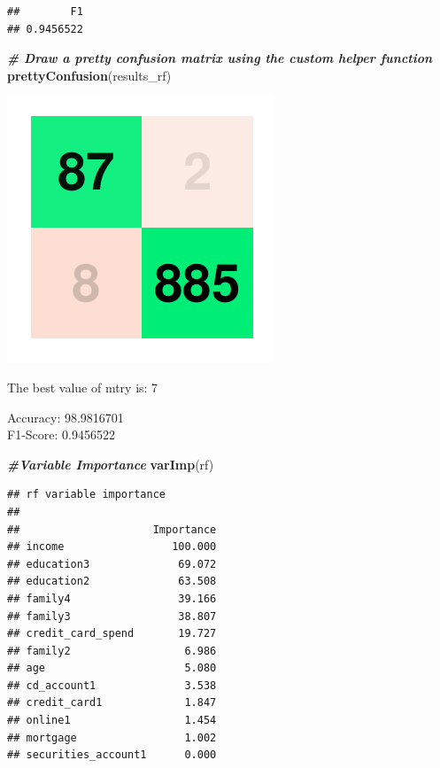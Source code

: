 \documentclass[
]{article}
\newenvironment{Shaded}{\begin{snugshade}}{\end{snugshade}}
\newcommand{\CommentTok}[1]{\textcolor[rgb]{0.00,0.40,1.00}{\textbf{\textit{#1}}}}
\newcommand{\KeywordTok}[1]{\textcolor[rgb]{0.26,0.66,0.93}{\textbf{#1}}}
\newcommand{\NormalTok}[1]{\textcolor[rgb]{0.74,0.68,0.62}{#1}}
\begin{document}
\begin{verbatim}
##        F1 
## 0.9456522
\end{verbatim}

\begin{Shaded}
\begin{Highlighting}[]
\CommentTok{# Draw a pretty confusion matrix using the custom helper function}
\KeywordTok{prettyConfusion}\NormalTok{(results_rf)}
\end{Highlighting}
\end{Shaded}

\includegraphics{Bank_Loan_Classification_files/figure-latex/unnamed-chunk-35-2.pdf}

The best value of mtry is: 7

Accuracy: 98.9816701\\
F1-Score: 0.9456522

\begin{Shaded}
\begin{Highlighting}[]
\CommentTok{#Variable Importance}
\KeywordTok{varImp}\NormalTok{(rf)}
\end{Highlighting}
\end{Shaded}

\begin{verbatim}
## rf variable importance
## 
##                     Importance
## income                 100.000
## education3              69.072
## education2              63.508
## family4                 39.166
## family3                 38.807
## credit_card_spend       19.727
## family2                  6.986
## age                      5.080
## cd_account1              3.538
## credit_card1             1.847
## online1                  1.454
## mortgage                 1.002
## securities_account1      0.000
\end{verbatim}
\end{document}
